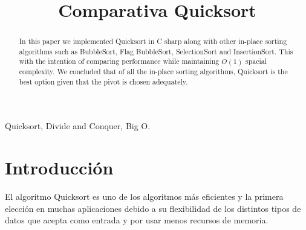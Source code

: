 \documentclass[conference]{IEEEtran}
\begin{document}
\title{Comparativa Quicksort}

\author{
\and
{}
}

\maketitle

\begin{abstract}
In this paper we implemented Quicksort in C sharp along with other in-place sorting algorithms such as BubbleSort, Flag BubbleSort, SelectionSort and InsertionSort.
This with the intention of comparing performance while maintaining $O(1)$ spacial complexity.
We concluded that of all the in-place sorting algorithms, Quicksort is the best option given that the pivot is chosen adequately.
\end{abstract}

\begin{IEEEkeywords}
Quicksort, Divide and Conquer, Big O.
\end{IEEEkeywords}


\section{Introducción}

El algoritmo Quicksort es uno de los algoritmos más eficientes y la 
primera elección en muchas aplicaciones debido a su flexibilidad de los distintos tipos de datos que acepta como entrada y por usar menos recursos de memoria.
\end{document}
